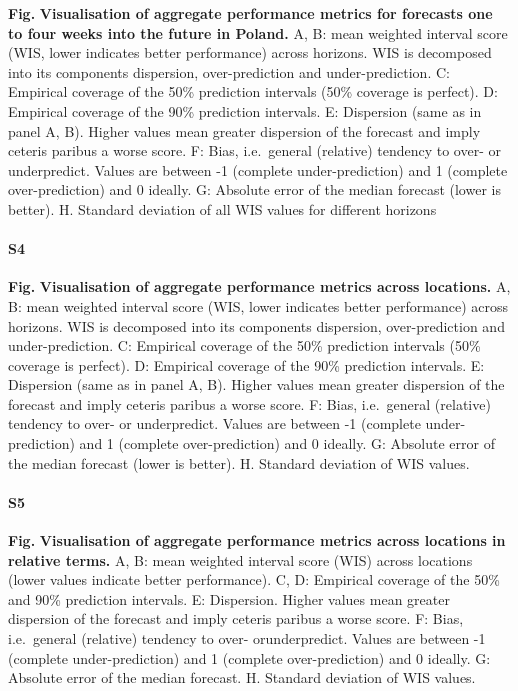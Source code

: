 \documentclass[10pt,letterpaper]{article}
\begin{document}
\textbf{Fig.} \label{fig:agg-performance-all-Poland}
\textbf{Visualisation of aggregate performance metrics for forecasts one to four weeks into the future in Poland.}
A, B: mean weighted interval score (WIS, lower indicates better
performance) across horizons. WIS is decomposed into its components
dispersion, over-prediction and under-prediction. C: Empirical coverage
of the 50\% prediction intervals (50\% coverage is perfect). D:
Empirical coverage of the 90\% prediction intervals. E: Dispersion (same
as in panel A, B). Higher values mean greater dispersion of the forecast
and imply ceteris paribus a worse score. F: Bias, i.e.~general
(relative) tendency to over- or underpredict. Values are between -1
(complete under-prediction) and 1 (complete over-prediction) and 0
ideally. G: Absolute error of the median forecast (lower is better). H.
Standard deviation of all WIS values for different horizons

\paragraph{S4}

\textbf{Fig.} \label{fig:performance-locations}
\textbf{Visualisation of aggregate performance metrics across locations.}
A, B: mean weighted interval score (WIS, lower indicates better
performance) across horizons. WIS is decomposed into its components
dispersion, over-prediction and under-prediction. C: Empirical coverage
of the 50\% prediction intervals (50\% coverage is perfect). D:
Empirical coverage of the 90\% prediction intervals. E: Dispersion (same
as in panel A, B). Higher values mean greater dispersion of the forecast
and imply ceteris paribus a worse score. F: Bias, i.e.~general
(relative) tendency to over- or underpredict. Values are between -1
(complete under-prediction) and 1 (complete over-prediction) and 0
ideally. G: Absolute error of the median forecast (lower is better). H.
Standard deviation of WIS values.

\paragraph{S5}

\textbf{Fig.} \label{fig:performance-locations-rel}
\textbf{Visualisation of aggregate performance metrics across locations in relative terms.}
A, B: mean weighted interval score (WIS) across locations (lower values
indicate better performance). C, D: Empirical coverage of the 50\% and
90\% prediction intervals. E: Dispersion. Higher values mean greater
dispersion of the forecast and imply ceteris paribus a worse score. F:
Bias, i.e.~general (relative) tendency to over- orunderpredict. Values
are between -1 (complete under-prediction) and 1 (complete
over-prediction) and 0 ideally. G: Absolute error of the median
forecast. H. Standard deviation of WIS values.
\end{document}
